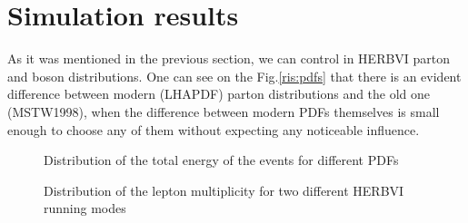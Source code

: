\documentclass[a4paper,12pt]{article}         %
\begin{document}
\section{Simulation results}
As it was mentioned in the previous section, we can control in HERBVI parton and boson distributions. One can see on the Fig.\ref{ris:pdfs} that there is an evident difference between modern (LHAPDF) parton distributions and the old one (MSTW1998), when the difference between modern PDFs themselves is small enough to choose any of them without expecting any noticeable influence.
\begin{figure}[h!]
\begin{minipage}[h]{0.49\linewidth}
\caption{Distribution of the total energy of the events for different PDFs}
\label{ris:pdfs}
\end{minipage}
\hfill
\begin{minipage}[h]{0.49\linewidth}
\caption{Distribution of the lepton multiplicity for two different HERBVI running modes}
\label{ris:iproc}
\end{minipage}
\end{figure}
\end{document}
